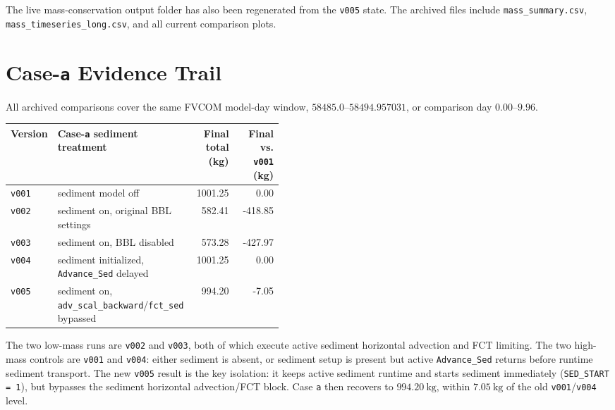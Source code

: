 \documentclass[11pt]{article}
\begin{document}
The live mass-conservation output folder has also been regenerated from the
\texttt{v005} state.  The archived files include \texttt{mass\_summary.csv},
\texttt{mass\_timeseries\_long.csv}, and all current comparison plots.

\section*{Case-\texttt{a} Evidence Trail}
All archived comparisons cover the same FVCOM model-day window,
\(58485.0\)--\(58494.957031\), or comparison day \(0.00\)--\(9.96\).

\begin{table}[h]
\centering
\small
\begin{tabular}{lp{0.45\linewidth}rr}
\toprule
Version & Case-\texttt{a} sediment treatment & Final total (kg) &
Final vs. \texttt{v001} (kg) \\
\midrule
\texttt{v001} & sediment model off & 1001.25 & 0.00 \\
\texttt{v002} & sediment on, original BBL settings & 582.41 & -418.85 \\
\texttt{v003} & sediment on, BBL disabled & 573.28 & -427.97 \\
\texttt{v004} & sediment initialized, \texttt{Advance\_Sed} delayed & 1001.25 & 0.00 \\
\texttt{v005} & sediment on, \texttt{adv\_scal\_backward}/\texttt{fct\_sed}
bypassed & 994.20 & -7.05 \\
\bottomrule
\end{tabular}
\end{table}

The two low-mass runs are \texttt{v002} and \texttt{v003}, both of which execute
active sediment horizontal advection and FCT limiting.  The two high-mass
controls are \texttt{v001} and \texttt{v004}: either sediment is absent, or
sediment setup is present but active \texttt{Advance\_Sed} returns before
runtime sediment transport.  The new \texttt{v005} result is the key isolation:
it keeps active sediment runtime and starts sediment immediately
(\texttt{SED\_START = 1}), but bypasses the sediment horizontal
advection/FCT block.  Case \texttt{a} then recovers to \(994.20~\mathrm{kg}\),
within \(7.05~\mathrm{kg}\) of the old \texttt{v001}/\texttt{v004} level.
\end{document}
